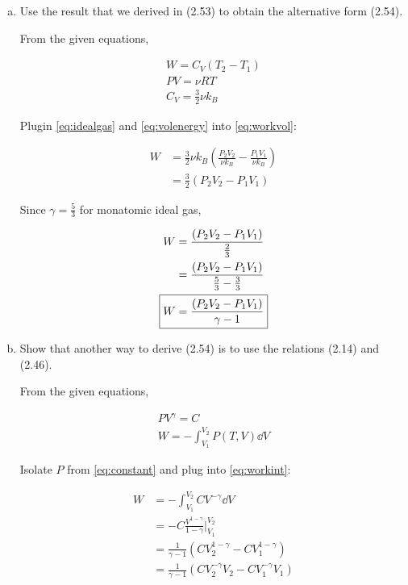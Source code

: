 \documentclass[9pt,a4paper,twocolumn]{article}
\begin{document}
\begin{enumerate}[(a)]

\item Use the result that we derived in (2.53) to obtain the alternative form (2.54).

From the given equations,

\begin{eqnarray}
	W = C_V \left( T_2 - T_1 \right) \label{eq:workvol} \\
	PV = \nu RT \label{eq:idealgas} \\
	C_V = \frac{3}{2} \nu k_B \label{eq:volenergy}
\end{eqnarray}

Plugin \eqref{eq:idealgas} and \eqref{eq:volenergy} into \eqref{eq:workvol}:

\begin{align}
	W & = \frac{3}{2} \nu k_B \left( \frac{P_2 V_2}{\nu k_B} - \frac{P_1 V_1}{\nu k_B} \right) \nonumber \\
	& = \frac{3}{2} \left( P_2 V_2 - P_1 V_1 \right)
\end{align}

Since $\gamma = \frac{5}{3}$ for monatomic ideal gas,

\begin{align}
	W & = \frac{\left( P_2 V_2 - P_1 V_1 \right)}{\frac{2}{3}} \nonumber \\
	& = \frac{\left( P_2 V_2 - P_1 V_1 \right)}{\frac{5}{3} - \frac{3}{3}} \nonumber \\
	\Aboxed{ W & = \frac{\left( P_2 V_2 - P_1 V_1 \right)}{\gamma - 1}} \label{eq:answer1}
\end{align}

\item Show that another way to derive (2.54) is to use the relations (2.14) and (2.46).

From the given equations,

\begin{eqnarray}
	PV^\gamma = C \label{eq:constant} \\
	W = -\int_{V_1}^{V_2} P(T,V) \dd{V} \label{eq:workint}
\end{eqnarray}

Isolate $P$ from \eqref{eq:constant} and plug into \eqref{eq:workint}:

\begin{align}
	W &= -\int_{V_1}^{V_2} C V^{-\gamma} \dd{V} \nonumber \\
	& = -C \frac{V^{1 - \gamma}}{1 - \gamma} \bigg|_{V_1}^{V_2} \nonumber \\
	& = \frac{1}{\gamma - 1}\left( CV_2^{1-\gamma} - CV_1^{1-\gamma} \right) \nonumber \\
	& = \frac{1}{\gamma - 1}\left( CV_2^{-\gamma}V_2 - CV_1^{-\gamma}V_1 \right)
\end{align}


\end{enumerate}
\end{document}
